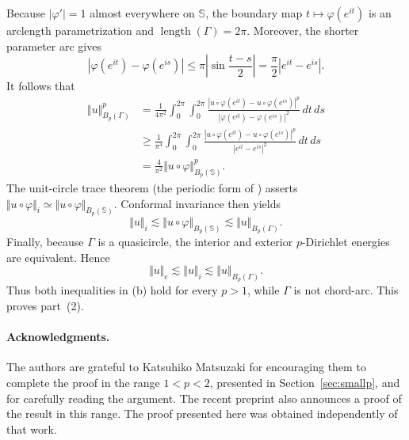 \documentclass[11pt]{article}
\numberwithin{equation}{section}
\theoremstyle{remark}
\begin{document}
Because $|\varphi'|=1$ almost everywhere on $\mathbb S$, the boundary
map $t\mapsto\varphi(e^{it})$ is an arclength parametrization and
$\operatorname{length}(\Gamma)=2\pi$.  Moreover, the shorter parameter arc
gives
\begin{equation}\label{upper-param}
|\varphi(e^{it})-\varphi(e^{is})|
\le \pi\left|\sin\frac{t-s}{2}\right|
=\frac{\pi}{2}|e^{it}-e^{is}|.
\end{equation}
It follows that
\begin{align*}
\Vert u \Vert_{B_p(\Gamma)}^p
&= \frac{1}{4\pi^2}\int_0^{2\pi}\int_0^{2\pi}
\frac{|u\circ\varphi(e^{it}) - u\circ\varphi(e^{is})|^p}
{|\varphi(e^{it})-\varphi(e^{is})|^2}\,dt\,ds\\
&\geq \frac{1}{\pi^4} \int_0^{2\pi}\int_0^{2\pi}
\frac{|u\circ\varphi(e^{it}) - u\circ\varphi(e^{is})|^p}
{|e^{it}-e^{is}|^2}\,dt\,ds\\
&= \frac{4}{\pi^2}\Vert u\circ\varphi \Vert_{B_p(\mathbb S)}^p.
\end{align*}
The unit-circle trace theorem (the periodic form of
\cite[Theorems~1.3 and~1.9]{MR}) asserts $\Vert u\circ\varphi\Vert_i \simeq \Vert u\circ\varphi\Vert_{B_p(\mathbb S)}$.  Conformal invariance then yields
\[
\Vert u\Vert_i\lesssim
\Vert u\circ\varphi\Vert_{B_p(\mathbb S)}
\lesssim\Vert u\Vert_{B_p(\Gamma)}.
\]
Finally, because $\Gamma$ is a quasicircle, the interior and exterior
$p$-Dirichlet energies are equivalent.  Hence
\[
\Vert u\Vert_e\lesssim\Vert u\Vert_i
\lesssim\Vert u\Vert_{B_p(\Gamma)}.
\]
Thus both inequalities in \rm(b) hold for every $p>1$, while $\Gamma$
is not chord-arc.  This proves part~\rm(2).

\paragraph*{Acknowledgments.}
The authors are grateful to Katsuhiko Matsuzaki for encouraging them
to complete the proof in the range $1<p<2$, presented in
Section~\ref{sec:smallp}, and for carefully reading the argument.
The recent preprint \cite{LSY} also announces a proof of the result in
this range. The proof presented here was obtained independently of
that work.

\begingroup
\small
\linespread{0.96}\selectfont
\end{document}
